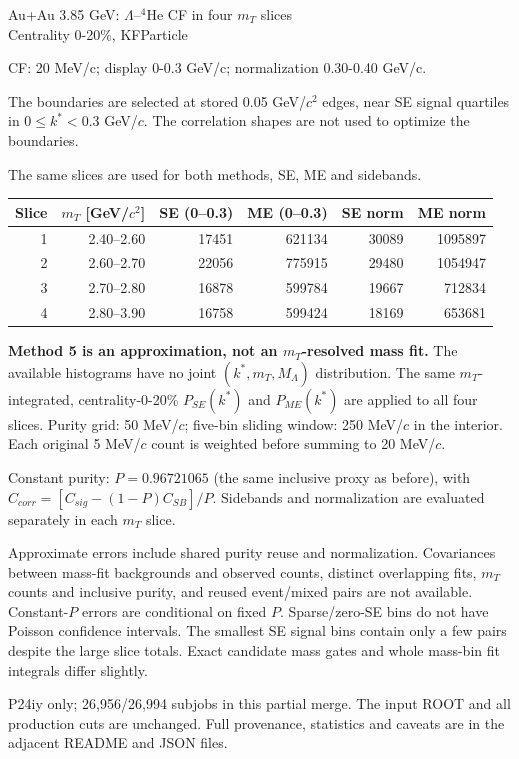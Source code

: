 \documentclass[10pt,a4paper]{article}
\begin{document}
\begin{center}\Large Au+Au 3.85 GeV: $\Lambda$--$^4$He CF in four $m_T$ slices\\
\large Centrality 0-20\%, KFParticle\end{center}
\noindent CF: 20 MeV/c; display 0-0.3 GeV/c; normalization 0.30-0.40 GeV/c.

\medskip
\noindent The boundaries are selected at stored 0.05 GeV/$c^2$ edges,
near SE signal quartiles in $0\leq k^*<0.3$ GeV/$c$.
The correlation shapes are not used to optimize the boundaries.

The same slices are used for both methods, SE, ME and sidebands.

\begin{center}\small\begin{tabular}{rrrrrr}\toprule
Slice & $m_T$ [GeV/$c^2$] & SE (0--0.3) & ME (0--0.3) & SE norm & ME norm\\\midrule
1 & 2.40–2.60 & 17451 & 621134 & 30089 & 1095897 \\
2 & 2.60–2.70 & 22056 & 775915 & 29480 & 1054947 \\
3 & 2.70–2.80 & 16878 & 599784 & 19667 & 712834 \\
4 & 2.80–3.90 & 16758 & 599424 & 18169 & 653681 \\
\bottomrule\end{tabular}\end{center}

\noindent\textbf{Method 5 is an approximation, not an $m_T$-resolved mass fit.}
The available histograms have no joint $(k^*,m_T,M_\Lambda)$ distribution.
The same $m_T$-integrated, centrality-0-20\% $P_{SE}(k^*)$ and $P_{ME}(k^*)$
are applied to all four slices. Purity grid: 50 MeV/$c$;
five-bin sliding window: 250 MeV/$c$ in the interior.
Each original 5 MeV/$c$ count is weighted before summing to 20 MeV/$c$.

\medskip
\noindent Constant purity: $P=0.96721065$ (the same inclusive proxy as before),
with $C_{corr}=[C_{sig}-(1-P)C_{SB}]/P$. Sidebands and normalization
are evaluated separately in each $m_T$ slice.

\medskip
\noindent Approximate errors include shared purity reuse and normalization.
Covariances between mass-fit backgrounds and observed counts, distinct overlapping
fits, $m_T$ counts and inclusive purity, and reused event/mixed pairs are not available.
Constant-$P$ errors are conditional on fixed $P$.
Sparse/zero-SE bins do not have Poisson confidence intervals.
The smallest SE signal bins contain only a few pairs despite the large slice totals.
Exact candidate mass gates and whole mass-bin fit integrals differ slightly.

\medskip
{} P24iy only; 26,956/26,994 subjobs in this partial merge.
The input ROOT and all production cuts are unchanged.
Full provenance, statistics and caveats are in the adjacent README and JSON files.
\clearpage



\end{document}
